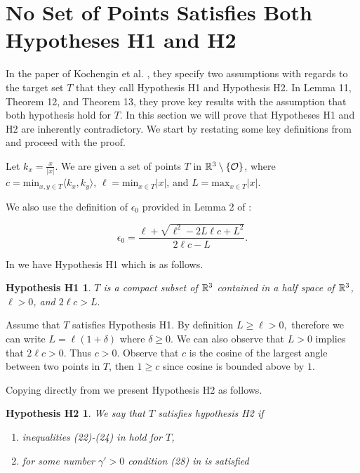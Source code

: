 \documentclass[review]{elsarticle}
\newtheorem*{h1*}{Hypothesis H1}
\newtheorem*{h2*}{Hypothesis H2}
\begin{document}
\section{No Set of Points Satisfies Both Hypotheses H1 and H2}\label{app:wrongKOT}

In the paper of Kochengin et al. \cite{KOT}, they specify two assumptions with regards to the target set $T$ that they call Hypothesis H1 and Hypothesis H2. In Lemma 11, Theorem 12, and Theorem 13, they prove key results with the assumption that both hypothesis hold for $T$. In this section we will prove that Hypotheses H1 and H2 are inherently contradictory. We start by restating some key definitions from \cite{KOT} and proceed with the proof.  

Let $k_x=\frac{x}{|x|}$. We are given a set of points $T$ in $\mathbb{R}^3\setminus\{\mathcal{O}\}$, where $c=\text{min}_{x,y\in T} \langle k_x,k_y\rangle$, $\ell=\text{min}_{x\in T} |x|$, and $L=\text{max}_{x\in T} |x|$.

We also use the definition of $\epsilon_0$ provided in Lemma 2 of \cite{KOT}:

\begin{equation}\label{KOT:e0}
    \epsilon_0 = \frac{\ell+\sqrt{\ell^2 -2L\ell c+L^2}}{2\ell c-L}.
\end{equation}


In \cite{KOT} we have Hypothesis H1 which is as follows.

\begin{h1*}
$T$ is a compact subset of $\mathbb{R}^3$ contained in a half space of $\mathbb{R}^3$, $\ell>0$, and $2\ell c>L.$
\end{h1*}

Assume that $T$ satisfies Hypothesis H1. By definition $L\ge \ell>0,$ therefore we can write $L=\ell(1+\delta)$ where $\delta \ge0$. We can also observe that $L>0$ implies that $2\ell c>0$. Thus $c>0.$ Observe that $c$ is the cosine of the largest angle between two points in $T$, then $1\ge c$ since cosine is bounded above by $1$.

Copying directly from \cite{KOT} we present Hypothesis H2 as follows.

\begin{h2*}
We say that $T$ satisfies hypothesis H2 if 
\begin{enumerate}
    \item inequalities (22)-(24) in \cite{KOT} hold for $T$,
    \item for some number $\gamma '>0$ condition (28) in \cite{KOT} is satisfied
\end{enumerate}
\end{h2*}
\end{document}
